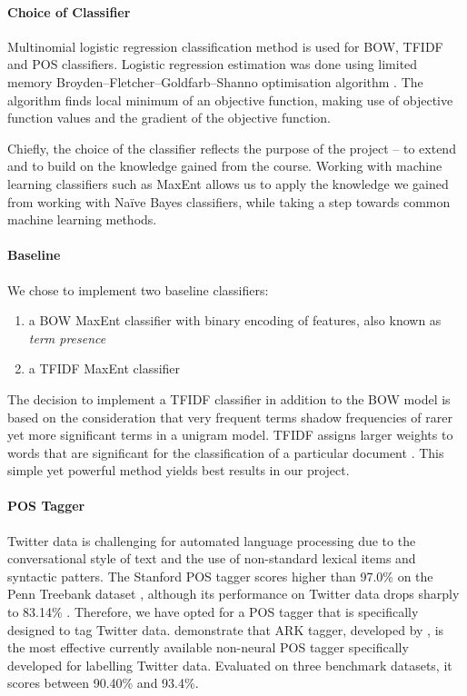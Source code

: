 \documentclass[titlepage]{article}
\begin{document}
      \paragraph{Choice of Classifier} Multinomial logistic regression classification method is used for BOW, TFIDF and POS classifiers. Logistic regression estimation was done using limited memory Broyden–Fletcher–Goldfarb–Shanno optimisation algorithm \citep{lbfgs}. The algorithm finds local minimum of an objective function, making use of objective function values and the gradient of the objective function.

Chiefly, the choice of the classifier reflects the purpose of the project -- to extend and to build on the knowledge gained from the course. Working with machine learning classifiers such as MaxEnt allows us to apply the knowledge we gained from working with Naïve Bayes classifiers, while taking a step towards common machine learning methods. 
      
      \paragraph{Baseline}
We chose to implement two baseline classifiers:
\begin{enumerate}
\item a BOW MaxEnt classifier with binary encoding of features, also known as \textit{term presence}
\item a TFIDF MaxEnt classifier 
\end{enumerate} 
      
      The decision to implement a TFIDF classifier in addition to the BOW model is based on the consideration that very frequent terms shadow frequencies of rarer yet more significant terms in a unigram model. TFIDF assigns larger weights to words that are significant for the classification of a particular document  \citep{Wang2018_WordClustering}. This simple yet powerful method yields best results in our project.

      \paragraph{POS Tagger} Twitter data is challenging for automated language processing due to the conversational style of text and the use of non-standard lexical items and syntactic patters. The Stanford POS tagger scores higher than 97.0\% on the Penn Treebank dataset \citep{penntree}, although its performance on Twitter data drops sharply to 83.14\% \citep{comparison-taggers}.
Therefore, we have opted for a POS tagger that is specifically designed to tag Twitter data. \citet{comparison-taggers} demonstrate that ARK tagger, developed by \citet{cmutagger2-paper}, is the most effective currently available non-neural POS tagger specifically developed for labelling Twitter data. Evaluated on three benchmark datasets, it scores between 90.40\% and 93.4\%. 
\end{document}
